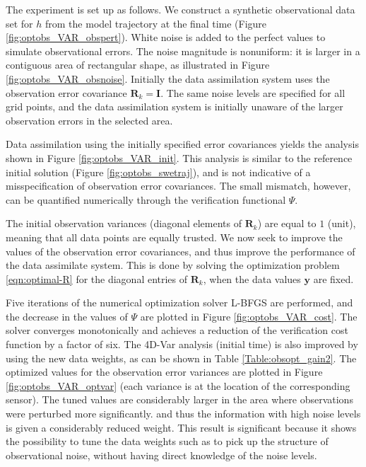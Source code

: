 \documentclass{article}
\newcommand{\R}{\mathbf{R}}
\newcommand{\y}{ \mathbf{y} }
\begin{document}
The experiment is set up as follows. We construct a synthetic observational data set for $h$
from the model trajectory at the final time (Figure \ref{fig:optobs_VAR_obspert}).
White noise is added to the perfect values to simulate observational errors. 
The noise magnitude is nonuniform: it is larger in a contiguous area of rectangular shape,
as illustrated in Figure \ref{fig:optobs_VAR_obsnoise}. Initially the data assimilation system uses the observation error 
covariance $\R_k = \mathbf{I}$. The same noise levels are specified for all grid points, and the data assimilation system is initially unaware of the
larger observation errors in the selected area.

Data assimilation using the initially specified error covariances yields the analysis shown in Figure \ref{fig:optobs_VAR_init}.
This analysis is similar to the reference initial solution (Figure \ref{fig:optobs_swetraj}), and is not indicative
of a misspecification of observation error covariances.
The small mismatch, however,  can be quantified numerically through the verification functional $\Psi$.

The initial observation variances (diagonal elements of $\R_k$) are equal to $1$ (unit), 
meaning that all data points are equally trusted. We now seek to improve the values of the observation error covariances, and thus improve the performance of
the data assimilate system. This is done by solving the optimization 
problem \eqref{eqn:optimal-R} for the diagonal entries of $\R_k$, when the data values $\y$ are fixed.

Five iterations of the numerical optimization solver L-BFGS are performed, and the decrease in the values of $\Psi$ 
are plotted in Figure \ref{fig:optobs_VAR_cost}.
The solver converges monotonically and achieves a reduction of the verification cost function by a factor of six.
The 4D-Var analysis (initial time) is also improved by using the new data weights, as can be shown in Table \ref{Table:obsopt_gain2}.
The optimized values for the observation error variances are plotted in Figure \ref{fig:optobs_VAR_optvar}
(each variance is at the location of the corresponding sensor).
The tuned values are considerably larger in the area where observations were perturbed more significantly.
and thus the information with high noise levels is given a considerably reduced weight.
This result is significant because it shows the possibility to tune the data weights such as to
pick up the structure of observational noise, without having direct knowledge of the noise levels.
\end{document}
